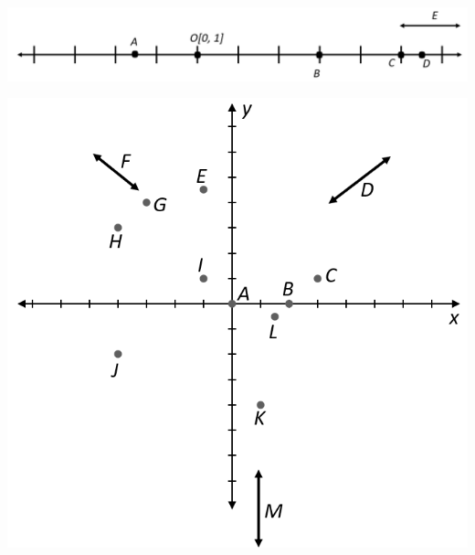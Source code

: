 \documentclass[11pt]{article}
\begin{document}
\begin{enumerate}
\begin{tcolorbox}
\begin{minipage}{0.45\textwidth}
\includegraphics[width=\textwidth, height=.5\textheight,keepaspectratio]{image2.png}
\end{minipage} \hfill
\begin{minipage}{0.45\textwidth}
\includegraphics[width=\textwidth, height=.5\textheight,keepaspectratio]{image1.png}
\end{minipage}


\end{tcolorbox}
\end{enumerate}
\end{document}

